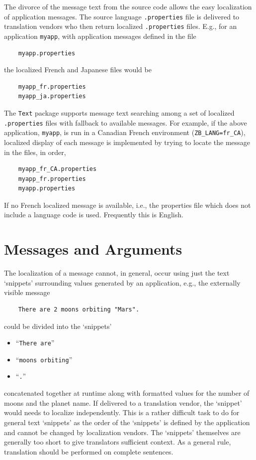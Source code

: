 The divorce of the message text from the source code allows the easy
localization of application messages.  The source language \texttt{.properties}
file is delivered to translation vendors who then return localized
\texttt{.properties} files.  E.g., for an application \texttt{myapp}, with
application messages defined in the file
\begin{verbatim}
    myapp.properties
\end{verbatim}
the localized French and Japanese files would be
\begin{verbatim}
    myapp_fr.properties
    myapp_ja.properties
\end{verbatim}

The \texttt{Text} package supports message text searching among a set of
localized \texttt{.properties} files with fallback to available messages.
For example, if the above application, \texttt{myapp}, is run in a Canadian
French environment (\texttt{ZB\_LANG=fr\_CA}), localized display of each message
is implemented by trying to locate the message in the files, in order,
\begin{verbatim}
    myapp_fr_CA.properties
    myapp_fr.properties
    myapp.properties
\end{verbatim}
If no French localized message is available, i.e., the properties file which
does not include a language code is used.  Frequently this is English.

\section{Messages and Arguments}

The localization of a message cannot, in general, occur using just the
text `snippets' surrounding values generated by an application, e.g., the
externally visible message
\begin{verbatim}
    There are 2 moons orbiting "Mars".
\end{verbatim}
could be divided into the `snippets'
\begin{itemize}
\item ``\texttt{There are}''
\item ``\texttt{moons orbiting}''
\item ``\texttt{.}''
\end{itemize}
concatenated together at runtime along with formatted values for the number
of moons and the planet name.
If delivered to a translation vendor, the `snippet' would needs to localize
independently. This is a rather
difficult task to do for general text `snippets' as the order of the
`snippets' is defined by the application and cannot be changed by localization
vendors.  The `snippets' themselves are generally too short to give
translators sufficient context.  As a general rule, translation should be
performed on complete sentences.

